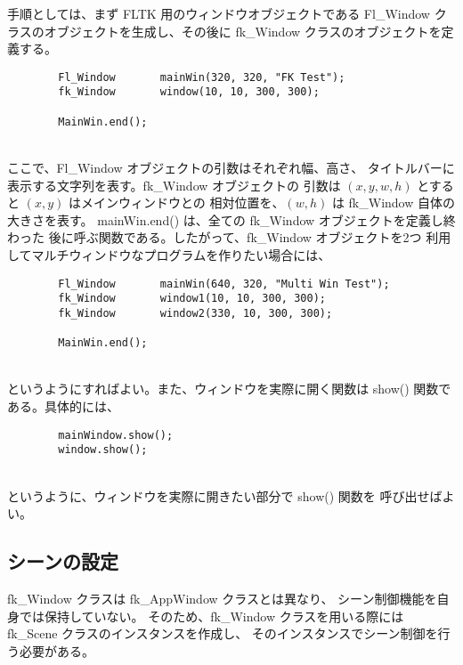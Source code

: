 手順としては、まず FLTK 用のウィンドウオブジェクトである
Fl\_Window クラスのオブジェクトを生成し、その後に fk\_Window
クラスのオブジェクトを定義する。
\\
\begin{screen}
\begin{verbatim}
        Fl_Window       mainWin(320, 320, "FK Test");
        fk_Window       window(10, 10, 300, 300);

        MainWin.end();
\end{verbatim}
\end{screen}
~ \\
ここで、Fl\_Window オブジェクトの引数はそれぞれ幅、高さ、
タイトルバーに表示する文字列を表す。fk\_Window オブジェクトの
引数は \((x, y, w, h)\) とすると \((x, y)\) はメインウィンドウとの
相対位置を、\((w, h)\) は fk\_Window 自体の大きさを表す。
mainWin.end() は、全ての fk\_Window オブジェクトを定義し終わった
後に呼ぶ関数である。したがって、fk\_Window オブジェクトを2つ
利用してマルチウィンドウなプログラムを作りたい場合には、
\\
\begin{breakbox}
\begin{verbatim}
        Fl_Window       mainWin(640, 320, "Multi Win Test");
        fk_Window       window1(10, 10, 300, 300);
        fk_Window       window2(330, 10, 300, 300);

        MainWin.end();
\end{verbatim}
\end{breakbox}
~ \\
というようにすればよい。また、ウィンドウを実際に開く関数は show() 関数で
ある。具体的には、
\\
\begin{screen}
\begin{verbatim}
        mainWindow.show();
        window.show();
\end{verbatim}
\end{screen}
~ \\
というように、ウィンドウを実際に開きたい部分で show() 関数を
呼び出せばよい。

\subsection{シーンの設定}
fk\_Window クラスは fk\_AppWindow クラスとは異なり、
シーン制御機能を自身では保持していない。
そのため、fk\_Window クラスを用いる際には
fk\_Scene クラスのインスタンスを作成し、
そのインスタンスでシーン制御を行う必要がある。

